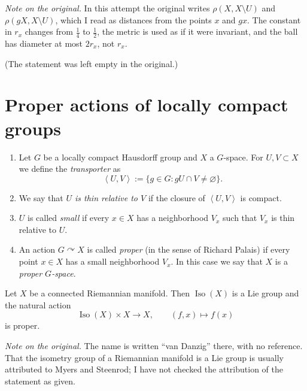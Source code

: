 \noindent
{\it Note on the original.} In this
attempt the original writes
$\rho(X,X\setminus U)$ and
$\rho(gX,X\setminus U)$, which I read
as distances from the points $x$ and
$gx$. The constant in $r_x$ changes
from $\frac{1}{4}$ to $\frac{1}{2}$,
the metric is used as if it were
invariant, and the ball has diameter at
most $2r_x$, not $r_x$.

\begin{theorem}[Dugundji]
\label{theorem-dugundji-canonical}
(The statement was left empty in the
original.)
\end{theorem}

\section{Proper actions of locally
compact groups}
\label{section-proper-actions}

\begin{definition}
\label{definition-proper-action}
\begin{enumerate}
\item Let $G$ be a locally compact
Hausdorff group and $X$ a $G$-space.
For $U,V\subset X$ we define the
{\it transporter} as
$$
\left\langle{} U,V \right\rangle{}
:=\{g\in G:gU\cap V\neq\varnothing\}.
$$
\item We say that
{\it $U$ is thin relative to $V$} if
the closure of
$\left\langle{} U,V \right\rangle{}$
is compact.
\item $U$ is called {\it small} if
every $x\in X$ has a neighborhood $V_x$
such that $V_x$ is thin relative to
$U$.
\item An action $G\curvearrowright X$
is called {\it proper} (in the sense of
Richard Palais) if every point
$x\in X$ has a small neighborhood
$V_x$. In this case we say that $X$ is
a {\it proper $G$-space}.
\end{enumerate}
\end{definition}

\begin{theorem}
\label{theorem-van-dantzig}
Let $X$ be a connected Riemannian
manifold. Then $\operatorname{Iso}(X)$
is a Lie group and the natural action
$$
\operatorname{Iso}(X)\times X\to X,
\qquad
(f,x)\mapsto f(x)
$$
is proper.
\end{theorem}

\noindent
{\it Note on the original.} The name is
written ``van Danzig'' there, with no
reference. That the isometry group of a
Riemannian manifold is a Lie group is
usually attributed to Myers and
Steenrod; I have not checked the
attribution of the statement as given.

